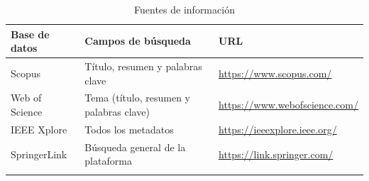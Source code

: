 \begin{table}[t]
\caption{Fuentes de información}\label{tab:bases}
\footnotesize
\begin{tabular*}{\textwidth}{@{\extracolsep\fill}lll@{}}
\toprule
Base de datos & Campos de búsqueda & URL \\
\midrule
Scopus & Título, resumen y palabras clave & \url{https://www.scopus.com/} \\
Web of Science & Tema (título, resumen y palabras clave) & \url{https://www.webofscience.com/} \\
IEEE Xplore & Todos los metadatos & \url{https://ieeexplore.ieee.org/} \\
SpringerLink & Búsqueda general de la plataforma & \url{https://link.springer.com/} \\
\botrule
\end{tabular*}
\end{table}

